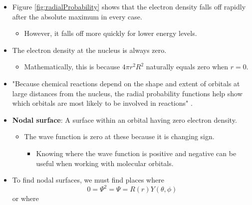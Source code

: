 \documentclass[../main.tex]{subfiles}
\begin{document}
\begin{itemize}
\begin{itemize}
        \item Its value is $a_0=\SI{52.9}{\pico\meter}$.
        \item It is a common unit in quantum mechanics.
        \item It is used to scale the functions in Figures \ref{fig:radialFunctions} and \ref{fig:radialProbability} to give reasonable axis units\footnote{Errata?: Should the $y$-axis in Figure \ref{fig:radialProbability} be $a_0^3r^2R^2$?}.
    \end{itemize}
    \item Figure \ref{fig:radialProbability} shows that the electron density falls off rapidly after the absolute maximum in every case.
    \begin{itemize}
        \item However, it falls off more quickly for lower energy levels.
    \end{itemize}
    \item The electron density at the nucleus is always zero.
    \begin{itemize}
        \item Mathematically, this is because $4\pi r^2R^2$ naturally equals zero when $r=0$.
    \end{itemize}
    \item "Because chemical reactions depend on the shape and extent of orbitals at large distances from the nucleus, the radial probability functions help show which orbitals are most likely to be involved in reactions" \parencite[23]{bib:MiesslerFischerTarr}.
    \item {}\textbf{Nodal surface}: A surface within an orbital having zero electron density.
    \begin{itemize}
        \item The wave function is zero at these because it is changing sign.
        \begin{itemize}
            \item Knowing where the wave function is positive and negative can be useful when working with molecular orbitals.
        \end{itemize}
    \end{itemize}
    \item To find nodal surfaces, we must find places where
    \begin{equation*}
        0 = \Psi^2 = \Psi = R(r)Y(\theta,\phi)
    \end{equation*}
    or where
    \begin{align*}

\end{align*}
\end{itemize}
\end{document}
